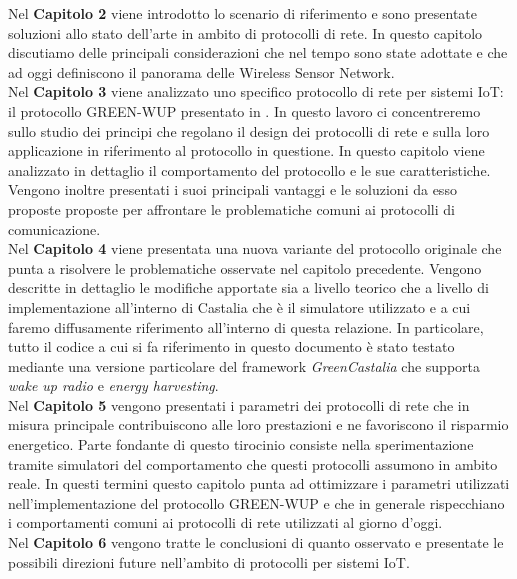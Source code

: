 \documentclass[binding=0.6cm,TFA]{sapthesis}
\begin{document}
Nel \textbf{Capitolo 2} viene introdotto lo scenario di riferimento e sono presentate soluzioni allo stato dell'arte in ambito di protocolli di rete. In questo
capitolo discutiamo delle principali considerazioni che nel tempo sono state adottate e che ad oggi definiscono il panorama delle Wireless Sensor Network.\\

Nel \textbf{Capitolo 3} viene analizzato uno specifico protocollo di rete per sistemi IoT: il protocollo GREEN-WUP presentato in \cite{novel-wake-up-receiver-paper}.
In questo lavoro ci concentreremo sullo studio dei principi che regolano il design dei protocolli di rete e sulla loro applicazione in riferimento al
protocollo in questione. In questo capitolo viene analizzato in dettaglio il comportamento del protocollo e le sue caratteristiche. Vengono inoltre presentati i
suoi principali vantaggi e le soluzioni da esso proposte proposte per affrontare le problematiche comuni ai protocolli di comunicazione.\\

Nel \textbf{Capitolo 4} viene presentata una nuova variante del protocollo originale che punta a risolvere le problematiche osservate nel capitolo precedente.
Vengono descritte in dettaglio le modifiche apportate sia a livello teorico che a livello di implementazione all'interno di Castalia che è
il simulatore utilizzato e a cui faremo diffusamente riferimento all'interno di questa relazione. In particolare, tutto il codice
a cui si fa riferimento in questo documento è stato testato mediante una versione particolare del framework \emph{GreenCastalia} \cite{greencastalia-paper}
che supporta \emph{wake up radio} e \emph{energy harvesting}.\\

Nel \textbf{Capitolo 5} vengono presentati i parametri dei protocolli di rete che in misura principale contribuiscono alle loro prestazioni e ne favoriscono
il risparmio energetico. Parte fondante di questo tirocinio consiste nella sperimentazione tramite simulatori del comportamento che questi protocolli
assumono in ambito reale. In questi termini questo capitolo punta ad ottimizzare i parametri utilizzati nell'implementazione del protocollo GREEN-WUP e
che in generale rispecchiano i comportamenti comuni ai protocolli di rete utilizzati al giorno d'oggi.\\

Nel \textbf{Capitolo 6} vengono tratte le conclusioni di quanto osservato e presentate le possibili direzioni future nell'ambito di protocolli per sistemi IoT.
\end{document}
